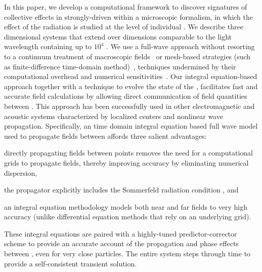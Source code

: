 In this paper, we develop a computational framework to discover signatures of collective effects in strongly-driven \qds{} within a microscopic formalism, in which the effect of the radiation is studied at the level of individual \qds{}.
We describe three dimensional systems that extend over dimensions comparable to the light wavelength containing up to $10^4$ \qds{}.
We use a full-wave approach without resorting to a continuum treatment of macroscopic fields~\cite{} or mesh-based strategies (such as finite-difference time-domain method)~\cite{Vanneste2001,Fratalocchi2008}, techniques undermined by their computational overhead and numerical sensitivities~\cite{Baczewski2013}.
Our integral equation-based approach together with a technique to evolve the  state of the \qd{}, facilitates fast and accurate field calculations by allowing direct communication of field quantities between \qds{}.
This approach has been successfully used in other electromagnetic \cite{otherpapersfromshanker} and acoustic \cite{Glosser2016} systems characterized by localized centers and nonlinear wave propagation.
Specifically, an time domain integral equation based full wave model used to propagate fields between \qds{} affords three salient advantages:
\begin{inparaenum}[(i)]
  \item directly propagating fields between points removes the need for a computational grids to propagate fields, thereby improving accuracy by eliminating numerical dispersion,
  \item the propagator explicitly includes the Sommerfeld radiation condition \cite{Stratton2007}, and
  \item an integral equation methodology models both near and far fields to very high accuracy (unlike differential equation methods that rely on an underlying grid).
\end{inparaenum}
These  integral equations are paired with a  highly-tuned predictor-corrector scheme to provide an accurate account of the propagation and phase effects between \qds{}, even for very close particles.
The entire system steps through time to provide a self-consistent transient solution. 


